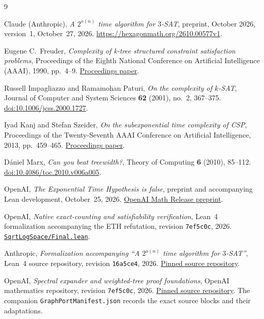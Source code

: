 \documentclass[11pt,reqno]{amsart}
\numberwithin{equation}{section}
\theoremstyle{definition}
\theoremstyle{remark}
\begin{document}
\begin{thebibliography}{9}
\raggedright

Claude (Anthropic),
\emph{A $2^{o(n)}$ time algorithm for $3$-SAT},
preprint, October 2026, version~1, October~27, 2026.
\url{https://hexagonmath.org/2610.00577v1}.

Eugene C.~Freuder,
\emph{Complexity of k-tree structured constraint satisfaction problems},
Proceedings of the Eighth National Conference on Artificial Intelligence (AAAI), 1990, pp.~4--9.
\href{https://www.aiinternational.org/Papers/AAAI/1990/AAAI90-001.pdf}{Proceedings paper}.

Russell Impagliazzo and Ramamohan Paturi,
\emph{On the complexity of $k$-SAT},
Journal of Computer and System Sciences \textbf{62} (2001), no.~2, 367--375.
\href{https://doi.org/10.1006/jcss.2000.1727}{doi:10.1006/jcss.2000.1727}.

Iyad Kanj and Stefan Szeider,
\emph{On the subexponential time complexity of CSP},
Proceedings of the Twenty-Seventh AAAI Conference on Artificial Intelligence, 2013, pp.~459--465.
\href{https://cdn.aaai.org/ojs/8609/8609-13-12137-1-2-20201228.pdf}{Proceedings paper}.

D\'aniel Marx,
\emph{Can you beat treewidth?},
Theory of Computing \textbf{6} (2010), 85--112.
\href{https://doi.org/10.4086/toc.2010.v006a005}{doi:10.4086/toc.2010.v006a005}.

OpenAI,
\emph{The Exponential Time Hypothesis is false},
preprint and accompanying Lean development, October~25, 2026.
\href{https://github.com/openai/math/tree/main/preprints/The-Exponential-Time-Hypothesis-is-False-October-25-2026}{OpenAI Math Release preprint}.

OpenAI,
\emph{Native exact-counting and satisfiability verification},
Lean~4 formalization accompanying the ETH refutation, revision
\texttt{7ef5c0c}, 2026.
\href{https://github.com/openai/math/blob/7ef5c0cc5ca4b0e072b7a050fca09ab24bc6fa3a/lean/OAI/Algorithms/SubexponentialSAT/SqrtLogSpace/Final.lean}{\texttt{SqrtLogSpace/Final.lean}}.

Anthropic,
\emph{Formalization accompanying ``A $2^{o(n)}$ time algorithm for $3$-SAT''},
Lean~4 source repository, revision \texttt{16a5ce4}, 2026.
\href{https://github.com/anthropics/formal-math/tree/16a5ce41304fcdaea4e0be7c132e1c361dc26da5/eth}{Pinned source repository}.

OpenAI,
\emph{Spectral expander and weighted-tree proof foundations},
OpenAI mathematics repository, revision \texttt{7ef5c0c}, 2026.
\href{https://github.com/openai/math/tree/7ef5c0cc5ca4b0e072b7a050fca09ab24bc6fa3a}{Pinned source repository}.
The companion \texttt{GraphPortManifest.json} records the exact source blocks and their adaptations.

\end{thebibliography}
\end{document}
